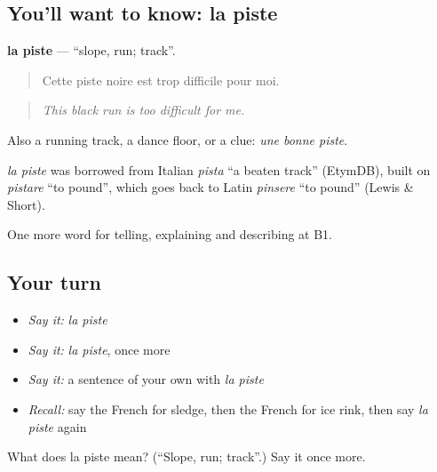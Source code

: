 \subsection*{You'll want to know: la piste}
\textbf{la piste} — \textquotedblleft{}slope, run; track\textquotedblright{}.

\begin{quote}
Cette piste noire est trop difficile pour moi.
\end{quote}

\begin{quote}
\emph{This black run is too difficult for me.}
\end{quote}

Also a running track, a dance floor, or a clue: \emph{une bonne piste}.

\begin{cousinweb}
\emph{la piste} was borrowed from Italian \emph{pista} \textquotedblleft{}a beaten track\textquotedblright{} (EtymDB), built on \emph{pistare} \textquotedblleft{}to pound\textquotedblright{}, which goes back to Latin \emph{pinsere} \textquotedblleft{}to pound\textquotedblright{} (Lewis \& Short).
\end{cousinweb}

\begin{grammarlens}[title={What you've built}]
One more word for telling, explaining and describing at B1.
\end{grammarlens}

\subsection*{Your turn}
\begin{itemize}
\raggedright
  \item \emph{Say it:} \emph{la piste}
  \item \emph{Say it:} \emph{la piste}, once more
  \item \emph{Say it:} a sentence of your own with \emph{la piste}
  \item \emph{Recall:} say the French for sledge, then the French for ice rink, then say \emph{la piste} again
\end{itemize}

\begin{tcolorbox}[breakable,colback=teal!4,colframe=teal!35!black,title={Before you move on}]
What does la piste mean? (\textquotedblleft{}Slope, run; track\textquotedblright{}.) Say it once more.
\end{tcolorbox}
